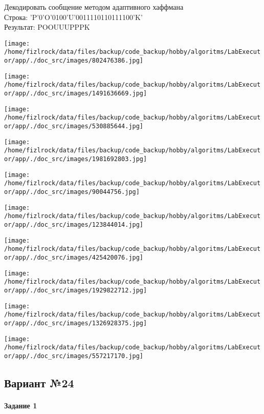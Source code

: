 \documentclass[a4paper, 12pt]{article}
\begin{document}
Декодировать сообщение методом адаптивного хаффмана \\
Строка: 
'P'0'O'0100'U'0011110110111100'K'\\
Результат: POOUUUPPPK

\texttt{[image: /home/fizlrock/data/files/backup/code\_backup/hobby/algoritms/LabExecutor/app/./doc\_src/images/802476386.jpg]}

\texttt{[image: /home/fizlrock/data/files/backup/code\_backup/hobby/algoritms/LabExecutor/app/./doc\_src/images/1491636669.jpg]}

\texttt{[image: /home/fizlrock/data/files/backup/code\_backup/hobby/algoritms/LabExecutor/app/./doc\_src/images/530885644.jpg]}

\texttt{[image: /home/fizlrock/data/files/backup/code\_backup/hobby/algoritms/LabExecutor/app/./doc\_src/images/1981692803.jpg]}

\texttt{[image: /home/fizlrock/data/files/backup/code\_backup/hobby/algoritms/LabExecutor/app/./doc\_src/images/90044756.jpg]}

\texttt{[image: /home/fizlrock/data/files/backup/code\_backup/hobby/algoritms/LabExecutor/app/./doc\_src/images/123844014.jpg]}

\texttt{[image: /home/fizlrock/data/files/backup/code\_backup/hobby/algoritms/LabExecutor/app/./doc\_src/images/425420076.jpg]}

\texttt{[image: /home/fizlrock/data/files/backup/code\_backup/hobby/algoritms/LabExecutor/app/./doc\_src/images/1929822712.jpg]}

\texttt{[image: /home/fizlrock/data/files/backup/code\_backup/hobby/algoritms/LabExecutor/app/./doc\_src/images/1326928375.jpg]}

\texttt{[image: /home/fizlrock/data/files/backup/code\_backup/hobby/algoritms/LabExecutor/app/./doc\_src/images/557217170.jpg]}
\pagebreak
\subsection{Вариант №24}
\paragraph{Задание 1}
\end{document}
